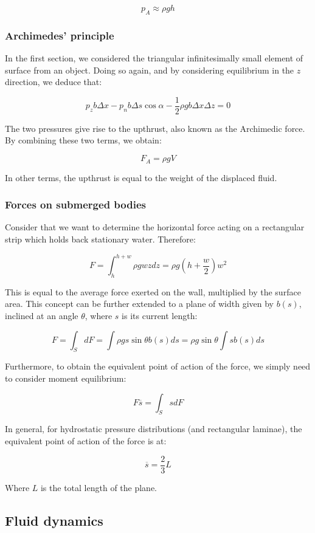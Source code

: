 \documentclass{article}
\begin{document}
\[  p_A \approx \rho gh\]

\subsubsection{Archimedes' principle}

In the first section, we considered the triangular infinitesimally small element of surface from an object. Doing so again, and by considering equilibrium in the $z$ direction, we deduce that:

\[ p_zb\Delta x - p_nb\Delta s\cos{\alpha} - \frac{1}{2}\rho g b\Delta x\Delta z = 0 \]

The two pressures give rise to the upthrust, also known as the Archimedic force. By combining these two terms, we obtain:

\[ F_A = \rho gV \]

In other terms, the upthrust is equal to the weight of the displaced fluid.

\subsubsection{Forces on submerged bodies}

Consider that we want to determine the horizontal force acting on a rectangular strip which holds back stationary water. Therefore:

\[ F = \int_h^{h + w} \rho gwzdz = \rho g \left(h + \frac{w}{2}\right)w^2 \]

This is equal to the average force exerted on the wall, multiplied by the surface area. This concept can be further extended to a plane of width given by $b(s)$, inclined at an angle $\theta$, where $s$ is its current length:

\[ F = \int_S dF = \int \rho g s\sin{\theta}b(s)ds = \rho g \sin{\theta} \int sb(s)ds \]

Furthermore, to obtain the equivalent point of action of the force, we simply need to consider moment equilibrium:

\[ F\overline{s} = \int_S sdF \]

In general, for hydrostatic pressure distributions (and rectangular laminae), the equivalent point of action of the force is at:

\[ \overline{s} = \frac{2}{3}L \]

Where $L$ is the total length of the plane.

\newpage

\subsection{Fluid dynamics}
\end{document}
